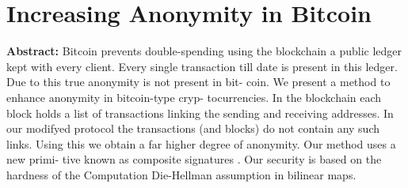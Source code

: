 \section{Increasing Anonymity in Bitcoin}

\textbf{Abstract:} 
Bitcoin prevents double-spending using the blockchain   a public  ledger  kept  with  every  client.  Every  single  transaction  till  date  is present in this ledger. Due to this  true anonymity is not present in bit- coin. We present a method to enhance anonymity in bitcoin-type cryp- tocurrencies.  In  the  blockchain   each  block  holds  a  list  of  transactions linking the sending and receiving addresses. In our modifyed protocol the transactions (and blocks) do not contain any such links. Using this  we obtain a far higher degree of anonymity. Our method uses a new primi- tive known as composite signatures . Our security is based on the hardness of the Computation Die-Hellman assumption in bilinear maps.
